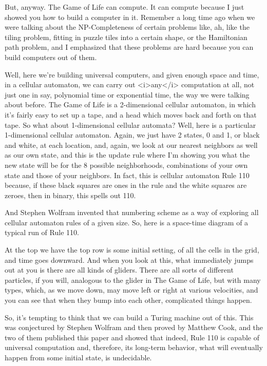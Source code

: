 \documentclass[]{article}
\begin{document}
But, anyway.
The Game of Life can compute.
It can compute because I just showed you
how to build a computer in it.
Remember a long time ago
when we were talking about
the NP-Completeness of certain problems
like, ah, like the tiling problem,
fitting in puzzle tiles
into a certain shape,
or the Hamiltonian path problem,
and I emphasized
that these problems are hard because
you can build computers out of them.

Well, here we're building
universal computers,
and given enough space and time,
in a cellular automaton,
we can carry out
<i>any</i> computation at all,
not just one in say,
polynomial time or exponential time,
the way we were talking about before.
The Game of Life is a 2-dimensional
cellular automaton,
in which it's fairly easy
to set up a tape,
and a head which moves back and forth
on that tape.
So what about 1-dimensional
cellular automata?
Well, here is a particular
1-dimensional cellular automaton.
Again, we just have 2 states,
0 and 1, or black and white,
at each location,
and, again,
we look at our nearest neighbors
as well as our own state,
and this is the update rule
where I'm showing you
what the new state will be
for the 8 possible neighborhoods,
combinations of your own state
and those of your neighbors.
In fact, this is cellular automaton
Rule 110
because, if these black squares are ones
in the rule
and the white squares are zeroes,
then in binary,
this spells out 110.

And Stephen Wolfram invented
that numbering scheme
as a way of exploring
all cellular automaton rules
of a given size.
So, here is a space-time diagram
of a typical run of Rule 110.

At the top we have
the top row is some initial
setting, of all the cells in the grid,
and time goes downward.
And when you look at this,
what immediately jumps out at you
is there are all kinds of gliders.
There are all sorts of different
particles, if you will, analogous to
the glider in The Game of Life,
but with many types,
which, as we move down,
may move left or right
at various velocities,
and you can see that
when they bump into each other,
complicated things happen.

So, it's tempting to think
that we can build a Turing machine
out of this.
This was conjectured by Stephen Wolfram
and then proved by Matthew Cook,
and the two of them published this paper
and showed that indeed, Rule 110
is capable of universal computation
and, therefore,
its long-term behavior,
what will eventually happen
from some initial state,
is undecidable.
\end{document}
